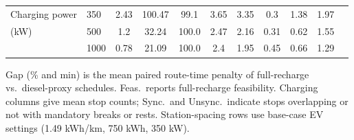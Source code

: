 \begin{table}[t]
\begin{threeparttable}
\begin{tabular}{
ll
S[table-format=1.2]
S[table-format=3.0]
S[table-format=3.1]
S[table-format=1.2]
S[table-format=1.2]
S[table-format=1.2]
S[table-format=1.2]
S[table-format=1.2]
S[table-format=1.2]
}
\addlinespace
Charging power & 350 & 2.43 & 100.47 & 99.1 & 3.65 & 3.35 & 0.3 & 1.38 & 1.97 \\
(kW) & 500 & 1.2 & 32.24 & 100.0 & 2.47 & 2.16 & 0.31 & 0.62 & 1.55 \\
 & 1000 & 0.78 & 21.09 & 100.0 & 2.4 & 1.95 & 0.45 & 0.66 & 1.29 \\
\bottomrule
\end{tabular}
\begin{tablenotes}[flushleft]
\footnotesize
\item Gap (\% and min) is the mean paired route-time penalty of full-recharge vs.\ diesel-proxy schedules. Feas.\ reports full-recharge feasibility. Charging columns give mean stop counts; Sync.\ and Unsync.\ indicate stops overlapping or not with mandatory breaks or rests. Station-spacing rows use base-case EV settings (1.49 kWh/km, 750 kWh, 350 kW).
\end{tablenotes}
\end{threeparttable}
\end{table}
